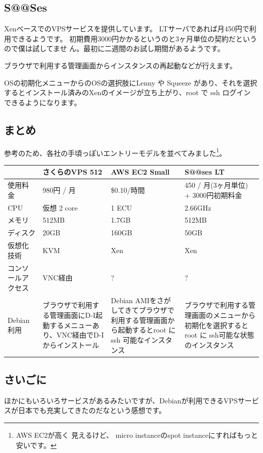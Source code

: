\documentclass[mingoth,a4paper]{jsarticle}
\begin{document}
\subsection{S@@Ses}

XenベースでのVPSサービスを提供しています。
LTサーバであれば月450円で利用できるようです。
初期費用3000円かかるというのと3ヶ月単位の契約だというので僕は試してませ
ん。最初に二週間のお試し期間があるようです。

ブラウザで利用する管理画面からインスタンスの再起動などが行えます。

OSの初期化メニューからのOSの選択肢にLenny や Squeeze があり、それを選択
するとインストール済みのXenのイメージが立ち上がり、root で ssh ログイン
できるようになります。

\subsection{まとめ}

参考のため、各社の手頃っぽいエントリーモデルを並べてみました\footnote{AWS EC2が高く
見えるけど、 micro instanceのspot instanceにすればもっと安いです。}。

\begin{tabular}{|l|p{11em}|p{12em}|p{11em}|}
\hline
 & さくらのVPS 512 & AWS EC2 Small & S@@ses LT \\
\hline
使用料金 & 980円 / 月& \$0.10/時間 & 450 / 月(3ヶ月単位) + 3000円初期料金\\
CPU & 仮想 2 core & 1 ECU & 2.66GHz\\
メモリ & 512MB & 1.7GB& 512MB \\
ディスク & 20GB & 160GB & 50GB \\
仮想化技術 & KVM & Xen & Xen \\
コンソールアクセス & VNC経由 & ? & ? \\
Debian利用 & 
ブラウザで利用する管理画面にD-I起動するメニューあり、VNC経由でD-Iからインストール& 
Debian AMIをさがしてきてブラウザで利用する管理画面から起動するとroot に ssh 可能なインスタンス & 
ブラウザで利用する管理画面のメニューから初期化を選択すると root に ssh可能な状態のインスタンス \\
\hline
\end{tabular}

\subsection{さいごに}

ほかにもいろいろサービスがあるみたいですが、Debianが利用できるVPSサービ
スが日本でも充実してきたのだなという感想です。
\end{document}
